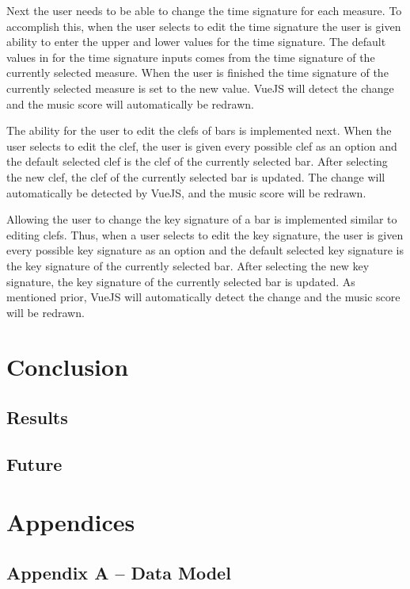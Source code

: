 \documentclass[letterpaper,12pt]{article}
\begin{document}
Next the user needs to be able to change the time signature for each measure. To accomplish this, when the user selects
to edit the time signature the user is given ability to enter the upper and lower values for the time signature. The
default values in for the time signature inputs comes from the time signature of the currently selected measure. When
the user is finished the time signature of the currently selected measure is set to the new value. VueJS will detect the
change and the music score will automatically be redrawn.

The ability for the user to edit the clefs of bars is implemented next. When the user selects to edit the clef, the
user is given every possible clef as an option and the default selected clef is the clef of the currently selected bar.
After selecting the new clef, the clef of the currently selected bar is updated. The change will automatically be
detected by VueJS, and the music score will be redrawn.

Allowing the user to change the key signature of a bar is implemented similar to editing clefs. Thus, when a user
selects to edit the key signature, the user is given every possible key signature as an option and the default selected
key signature is the key signature of the currently selected bar. After selecting the new key signature, the key
signature of the currently selected bar is updated. As mentioned prior, VueJS will automatically detect the change and
the music score will be redrawn.

\section{Conclusion}

\subsection{Results}

\subsection{Future}

\newpage

\section{Appendices}

\subsection{Appendix A -- Data Model}
\end{document}
